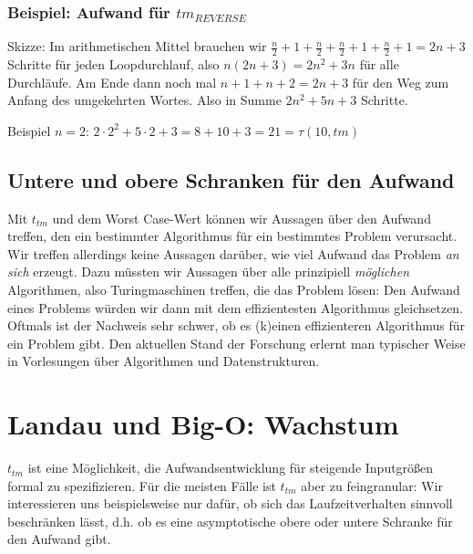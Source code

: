\subsubsection{Beispiel: Aufwand für $tm_{REVERSE}$}

Skizze: 
Im arithmetischen Mittel brauchen wir
$\frac{n}{2}+1+\frac{n}{2}+\frac{n}{2}+1+\frac{n}{2}+1 = 2n+3$
Schritte für jeden Loopdurchlauf, 
also
$n(2n + 3) = 2n^2 + 3n$ für alle Durchläufe.
Am Ende dann noch mal
$n + 1 + n + 2 = 2n + 3$ für den Weg zum Anfang des umgekehrten Wortes.
Also in Summe $2n^2 + 5n + 3$ Schritte.

Beispiel $n = 2$: $2\cdot2^2 + 5\cdot2 + 3 = 8 + 10 + 3 = 21 = \tau(10, tm)$
\subsection{Untere und obere Schranken für den Aufwand}
Mit $t_{tm}$ und dem Worst Case-Wert können wir Aussagen über den Aufwand treffen,
den ein bestimmter Algorithmus für ein bestimmtes Problem verursacht.
Wir treffen allerdings keine Aussagen darüber,
wie viel Aufwand das Problem \emph{an sich} erzeugt.
Dazu müssten wir Aussagen über alle prinzipiell \emph{möglichen} Algorithmen,
also Turingmaschinen treffen,
die das Problem lösen:
Den Aufwand eines Problems würden wir dann mit dem effizientesten Algorithmus gleichsetzen.
Oftmals ist der Nachweis sehr schwer,
ob es (k)einen effizienteren Algorithmus
für ein Problem gibt.
Den aktuellen Stand der Forschung erlernt man typischer Weise in Vorlesungen über
Algorithmen und Datenstrukturen.


\section{Landau und Big-O: Wachstum}

$t_{tm}$ ist eine Möglichkeit,
die Aufwandsentwicklung für steigende Inputgrößen formal zu spezifizieren.
Für die meisten Fälle ist $t_{tm}$ aber zu feingranular:
Wir interessieren uns beispielsweise nur dafür,
ob sich das Laufzeitverhalten sinnvoll beschränken lässt,
d.h. ob es eine asymptotische obere oder untere Schranke für den Aufwand gibt.


